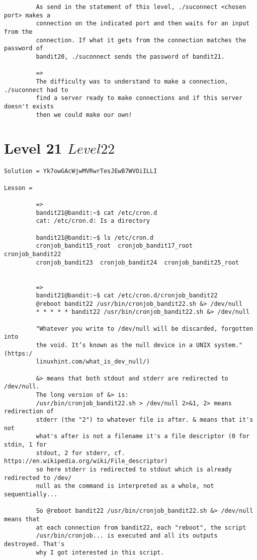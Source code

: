 \documentclass[a4paper]{report}
\begin{document}
\begin{verbatim}
		 As send in the statement of this level, ./suconnect <chosen port> makes a 
		 connection on the indicated port and then waits for an input from the 
		 connection. If what it gets from the connection matches the password of 
		 bandit20, ./suconnect sends the password of bandit21.

		 =>
		 The difficulty was to understand to make a connection, ./suconnect had to
		 find a server ready to make connections and if this server doesn't exists
		 then we could make our own!
\end{verbatim}


\section{Level 21 \rightarrow $ Level 22 $}

\begin{verbatim}
Solution = Yk7owGAcWjwMVRwrTesJEwB7WVOiILLI

Lesson = 

		 =>
		 bandit21@bandit:~$ cat /etc/cron.d
		 cat: /etc/cron.d: Is a directory
		 
		 bandit21@bandit:~$ ls /etc/cron.d
		 cronjob_bandit15_root  cronjob_bandit17_root  cronjob_bandit22 
		 cronjob_bandit23  cronjob_bandit24  cronjob_bandit25_root


		 =>
		 bandit21@bandit:~$ cat /etc/cron.d/cronjob_bandit22
		 @reboot bandit22 /usr/bin/cronjob_bandit22.sh &> /dev/null
		 * * * * * bandit22 /usr/bin/cronjob_bandit22.sh &> /dev/null
		 
		 "Whatever you write to /dev/null will be discarded, forgotten into 
		 the void. It’s known as the null device in a UNIX system." (https:/
		 linuxhint.com/what_is_dev_null/)

		 &> means that both stdout and stderr are redirected to /dev/null. 
		 The long version of &> is: 
		 /usr/bin/cronjob_bandit22.sh > /dev/null 2>&1, 2> means redirection of 
		 stderr (the "2") to whatever file is after. & means that it's not
		 what's after is not a filename it's a file descriptor (0 for stdin, 1 for 
		 stdout, 2 for stderr, cf. https://en.wikipedia.org/wiki/File_descriptor)
		 so here stderr is redirected to stdout which is already redirected to /dev/
		 null as the command is interpreted as a whole, not sequentially...
		 
		 So @reboot bandit22 /usr/bin/cronjob_bandit22.sh &> /dev/null means that 
		 at each connection from bandit22, each "reboot", the script
		 /usr/bin/cronjob... is executed and all its outputs destroyed. That's 
		 why I got interested in this script.


\end{verbatim}
\end{document}
